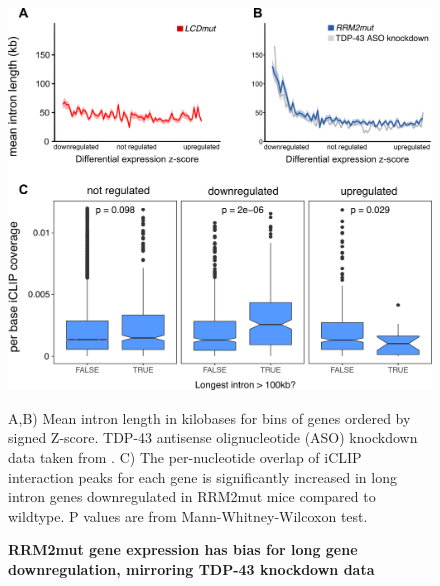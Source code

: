 \begin{figure}[h!]
	\centering
	\includegraphics[width=14cm]{Figures/05_tdp_mice/long_genes_multi.png}
	\caption{\textbf{RRM2mut gene expression has bias for long gene downregulation, mirroring TDP-43 knockdown data}}
	A,B) Mean intron length in kilobases for bins of genes ordered by signed Z-score. TDP-43 antisense olignucleotide (ASO) knockdown data taken from \cite{Polymenidou2011-hs}. C) The per-nucleotide overlap of iCLIP interaction peaks for each gene is significantly increased in long intron genes downregulated in RRM2mut mice compared to wildtype. P values are from Mann-Whitney-Wilcoxon test.
	\label{fig:long_genes}
\end{figure}

